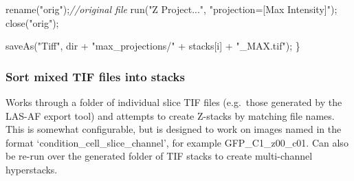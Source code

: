 \documentclass[
  12pt,
  a4paper,
]{book}
\newenvironment{Shaded}{}{}
\newcommand{\CommentTok}[1]{\textcolor[rgb]{0.38,0.63,0.69}{\textit{#1}}}
\newcommand{\NormalTok}[1]{#1}
\newcommand{\OperatorTok}[1]{\textcolor[rgb]{0.40,0.40,0.40}{#1}}
\newcommand{\StringTok}[1]{\textcolor[rgb]{0.25,0.44,0.63}{#1}}
\begin{document}
\begin{Shaded}
\begin{Highlighting}[]
\NormalTok{    rename}\OperatorTok{(}\StringTok{"orig"}\OperatorTok{);}\CommentTok{//original file}
\NormalTok{    run}\OperatorTok{(}\StringTok{"Z Project..."}\OperatorTok{,} \StringTok{"projection=[Max Intensity]"}\OperatorTok{);}
\NormalTok{    close}\OperatorTok{(}\StringTok{"orig"}\OperatorTok{);}

\NormalTok{    saveAs}\OperatorTok{(}\StringTok{"Tiff"}\OperatorTok{,}\NormalTok{ dir }\OperatorTok{+} \StringTok{"max\_projections/"} \OperatorTok{+}\NormalTok{ stacks}\OperatorTok{[}\NormalTok{i}\OperatorTok{]} \OperatorTok{+} \StringTok{"\_MAX.tif"}\OperatorTok{);}
\OperatorTok{\}}
\end{Highlighting}
\end{Shaded}

\subsubsection{Sort mixed TIF files into stacks}\label{sort-mixed-tif-files-into-stacks}

Works through a folder of individual slice TIF files (e.g.~those generated by the LAS-AF export tool) and attempts to create Z-stacks by matching file names. This is somewhat configurable, but is designed to work on images named in the format `condition\_cell\_slice\_channel', for example GFP\_C1\_z00\_c01. Can also be re-run over the generated folder of TIF stacks to create multi-channel hyperstacks.
\end{document}
